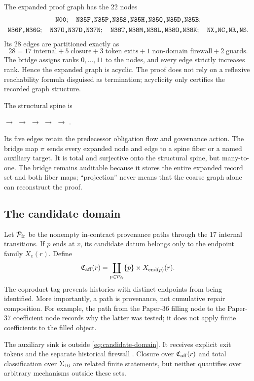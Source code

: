 The expanded proof graph has the 22 nodes
\begin{multline*}
\texttt{N00};\quad
\texttt{N35F,N35P,N35S,N35H,N35Q,N35D,N35B};\\
\texttt{N36F,N36G};\quad
\texttt{N37O,N37D,N37N};\quad
\texttt{N38T,N38M,N38L,N38O,N38K};\quad
\texttt{NX,NC,NR,NS}.
\end{multline*}
Its 28 edges are partitioned exactly as
\begin{equation}
28=17\;\text{internal}+5\;\text{closure}+3\;\text{token exits}
  +1\;\text{non-domain firewall}+2\;\text{guards}.
\label{eq:edge-partition}
\end{equation}
The bridge assigns ranks $0,\ldots,11$ to the nodes, and every edge strictly
increases rank.  Hence the expanded graph is acyclic.  The proof does not rely
on a reflexive reachability formula disguised as termination; acyclicity only
certifies the recorded graph structure.

The structural spine is
\begin{center}
\small
{}
$\to$ 
$\to$ 
$\to$ 
$\to$ 
$\to$ .
\end{center}
Its five edges retain the predecessor obligation flow and governance action.
The bridge map $\pi$ sends every expanded node and edge to a spine fiber or a
named auxiliary target.  It is total and surjective onto the structural spine,
but many-to-one.  The bridge remains auditable because it stores the entire
expanded record set and both fiber maps; “projection” never means that the
coarse graph alone can reconstruct the proof.

\subsection{The candidate domain}

Let $\mathcal{P}_{\mathrm{fr}}$ be the nonempty in-contract provenance paths through the 17
internal transitions.  If $p$ ends at $v$, its candidate datum belongs only to
the endpoint family $X_v(r)$.  Define
\begin{equation}
\mathfrak{C}_{\mathrm{aff}}(r)=\coprod_{p\in\mathcal{P}_{\mathrm{fr}}}\{p\}\times X_{\operatorname{end}(p)}(r).
\label{eq:candidate-domain}
\end{equation}
The coproduct tag prevents histories with distinct endpoints from being
identified.  More importantly, a path is provenance, not cumulative repair
composition.  For example, the path from the Paper-36 filling node to the
Paper-37 coefficient node records why the latter was tested; it does not apply
finite coefficients to the filled object.

The auxiliary sink  is outside \cref{eq:candidate-domain}.  It receives
explicit exit tokens and the separate historical firewall .  Closure
over $\mathfrak{C}_{\mathrm{aff}}(r)$ and total classification over $\Sigma_{16}$ are related finite
statements, but neither quantifies over arbitrary mechanisms outside these
sets.
